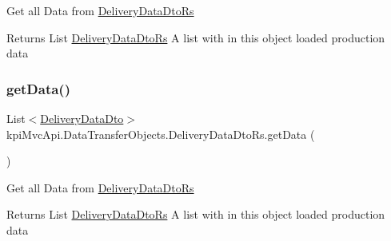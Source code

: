 Get all Data from {\ttfamily \hyperlink{classkpi_mvc_api_1_1_data_transfer_objects_1_1_delivery_data_dto_rs}{Delivery\+Data\+Dto\+Rs}} 

\begin{DoxyReturn}{Returns}
{\ttfamily  List \hyperlink{classkpi_mvc_api_1_1_data_transfer_objects_1_1_delivery_data_dto_rs}{Delivery\+Data\+Dto\+Rs} } A list with in this object loaded production data 
\end{DoxyReturn}
\mbox{\label{classkpi_mvc_api_1_1_data_transfer_objects_1_1_delivery_data_dto_rs_a7c771808f4607524b53ee7a65fec5119}} 
\subsubsection{\texorpdfstring{get\+Data()}{getData()}\hspace{0.1cm}{\footnotesize\ttfamily [2/2]}}
{\footnotesize\ttfamily List$<$\hyperlink{classkpi_mvc_api_1_1_data_transfer_objects_1_1_delivery_data_dto}{Delivery\+Data\+Dto}$>$ kpi\+Mvc\+Api.\+Data\+Transfer\+Objects.\+Delivery\+Data\+Dto\+Rs.\+get\+Data (\begin{DoxyParamCaption}{ }\end{DoxyParamCaption})\hspace{0.3cm}{\ttfamily [inline]}}



Get all Data from {\ttfamily \hyperlink{classkpi_mvc_api_1_1_data_transfer_objects_1_1_delivery_data_dto_rs}{Delivery\+Data\+Dto\+Rs}} 

\begin{DoxyReturn}{Returns}
{\ttfamily  List \hyperlink{classkpi_mvc_api_1_1_data_transfer_objects_1_1_delivery_data_dto_rs}{Delivery\+Data\+Dto\+Rs} } A list with in this object loaded production data 
\end{DoxyReturn}
\mbox{\label{classkpi_mvc_api_1_1_data_transfer_objects_1_1_delivery_data_dto_rs_a73e5ded80e01f064d9c1e8911234e111}} 
